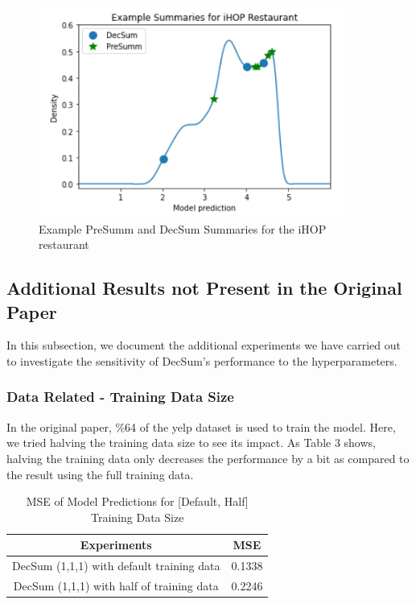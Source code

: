 \documentclass{article}
\begin{document}
\begin{figure}[!ht]
    \centering
    \includegraphics[scale = 0.8]{../assets/PDF}
    \caption{Example PreSumm and DecSum Summaries for the iHOP restaurant}
    \label{fig:2}
\end{figure}

\pagebreak
\subsection{Additional Results not Present in the Original Paper}
In this subsection, we document the additional experiments we have carried out to investigate the sensitivity of DecSum's performance to the hyperparameters.

\subsubsection{Data Related - Training Data Size}
In the original paper, \%64 of the yelp dataset is used to train the model. Here, we tried halving the training data size to see its impact. As Table 3 shows, halving the training data only decreases
the performance by a bit as compared to the result using the full training data.

\begin{table}[ht]
    \centering
    \caption{MSE of Model Predictions for [Default, Half] Training Data Size}
    \begin{tabular}{|c|c|}
        \hline \textbf{Experiments} & \textbf{MSE} \\
        \hline DecSum (1,1,1) with default training data & 0.1338 \\
        \hline DecSum (1,1,1) with half of training data & 0.2246 \\ \hline
    \end{tabular}
\end{table}
\end{document}
